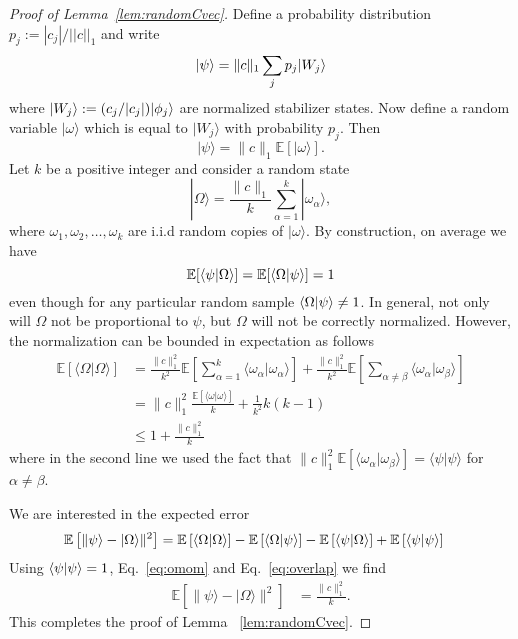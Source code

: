 \begin{proof}[Proof of Lemma~\ref{lem:randomCvec}]
Define a probability distribution $p_j := |c_j| / || c ||_1$ and write
\begin{equation}
\vert\psi\rangle = \|c\|_1\sum_j p_j 	\vert W_j\rangle 
\end{equation}	
where $\vert W_j\rangle:= (c_j/|c_j|) 	\vert\phi_j\rangle $ are normalized stabilizer states. Now define a random variable $|\omega\rangle$ which is equal to $|W_j\rangle$ with probability $p_j$.   Then
\begin{equation}
|\psi\rangle=\|c\|_1\mathbb{E}\left[|\omega\rangle\right].
\end{equation}	
Let $k$ be a positive integer and consider a random state 
\begin{equation}
|\Omega\rangle=\frac{\|c\|_1}{k}\sum_{\alpha=1}^{k} |\omega_\alpha\rangle ,
\label{eq:Omega}
\end{equation}
where $\omega_1,\omega_2,\ldots,\omega_k$ are i.i.d random copies of $|\omega\rangle$.  By construction,  on average we have
\begin{equation}
 \mathbb{E} [ \langle \psi\vert \Omega\rangle ] =  \mathbb{E} [ \langle \Omega\vert \psi\rangle ] = 1
\label{eq:overlap}
\end{equation}
even though for any particular random sample $ \langle \Omega\vert \psi\rangle \neq 1$.  In general, not only will $\Omega$ not be proportional to $\psi$, but $\Omega$  will not be correctly normalized.  However, the normalization can be bounded in expectation as follows
\begin{align}
\mathbb{E}\left[\langle \Omega |\Omega\rangle\right]&=\frac{\|c\|_1^2}{k^2}\mathbb{E}\left[\sum_{\alpha=1}^{k} \langle \omega_\alpha|\omega_\alpha\rangle\right]+\frac{\|c\|_1^2}{k^2}\mathbb{E}\left[\sum_{\alpha\neq \beta} \langle \omega_\alpha|\omega_\beta\rangle\right]\\
&=\|c\|_1^2\frac{\mathbb{E}\left[\langle \omega|\omega\rangle\right]}{k}+\frac{1}{k^2} k(k-1)\\
&\leq 1+\frac{\|c\|_1^2}{k}
\label{eq:omom}
\end{align}
where in the second line we used the fact that $\|c\|_1^2\mathbb{E}\left[\langle \omega_\alpha|\omega_\beta\rangle\right]=\langle \psi|\psi\rangle$ for $\alpha\neq \beta$. 

We are interested in the expected error 
\begin{align}
 \mathbb{E}\left[ \|\psi\rangle -|\Omega\rangle\|^2\right] & = \mathbb{E}\left[ \langle \Omega\vert \Omega\rangle \right]- \mathbb{E}\left[ \langle \Omega\vert \psi\rangle \right]-\mathbb{E}\left[ \langle \psi\vert \Omega\rangle \right]+\mathbb{E}\left[ \langle \psi\vert \psi\rangle \right]
\label{eq:experror}
\end{align} 
Using  $\langle \psi\vert \psi\rangle=1$, Eq.~\eqref{eq:omom} and Eq.~\eqref{eq:overlap} we find 
\begin{align}
  \mathbb{E}\left[ \|\psi\rangle -|\Omega\rangle\|^2\right] & =  \frac{\|c\|_1^2}{k}.
\end{align}
This completes the proof of Lemma ~\ref{lem:randomCvec}.
\end{proof}
